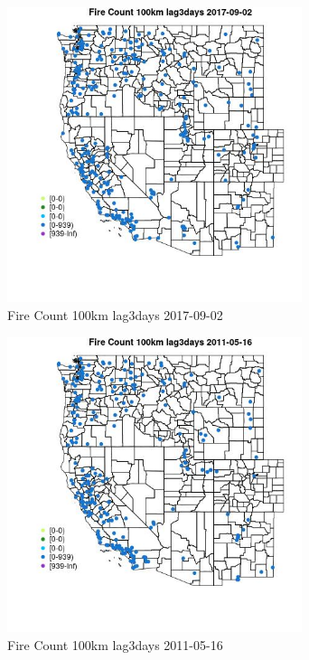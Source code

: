 \begin{figure} 
\centering  
\includegraphics[width=0.77\textwidth]{Code_Outputs/Report_ML_input_PM25_Step4_part_e_de_duplicated_aves_compiled_2019-05-20wNAs_MapObsFire_Count_100km_lag3days2017-09-02.jpg} 
\caption{\label{fig:Report_ML_input_PM25_Step4_part_e_de_duplicated_aves_compiled_2019-05-20wNAsMapObsFire_Count_100km_lag3days2017-09-02}Fire Count 100km lag3days 2017-09-02} 
\end{figure} 
 

\begin{figure} 
\centering  
\includegraphics[width=0.77\textwidth]{Code_Outputs/Report_ML_input_PM25_Step4_part_e_de_duplicated_aves_compiled_2019-05-20wNAs_MapObsFire_Count_100km_lag3days2011-05-16.jpg} 
\caption{\label{fig:Report_ML_input_PM25_Step4_part_e_de_duplicated_aves_compiled_2019-05-20wNAsMapObsFire_Count_100km_lag3days2011-05-16}Fire Count 100km lag3days 2011-05-16} 
\end{figure} 
 

